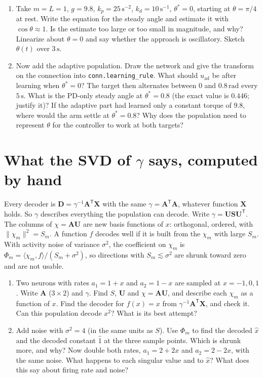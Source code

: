 \documentclass[11pt,letterpaper]{article}
\newcommand{\T}{\mathsf{T}}
\begin{document}
\begin{enumerate}
\item Take $m = L = 1$, $g = 9.8$, $k_p = 25\,\mathrm{s^{-2}}$, $k_d = 10\,\mathrm{s^{-1}}$, $\theta^* = 0$, starting at $\theta = \pi/4$ at rest. Write the equation for the steady angle and estimate it with $\cos\theta \approx 1$. Is the estimate too large or too small in magnitude, and why? Linearize about $\theta = 0$ and say whether the approach is oscillatory. Sketch $\theta(t)$ over $3\,\mathrm{s}$.
\item Now add the adaptive population. Draw the network and give the transform on the connection into \texttt{conn.learning\_rule}. What should $u_{\mathrm{ad}}$ be after learning when $\theta^* = 0$? The target then alternates between $0$ and $0.8\,\mathrm{rad}$ every $5\,\mathrm{s}$. What is the PD-only steady angle at $\theta^* = 0.8$ (the exact value is $0.446$; justify it)? If the adaptive part had learned only a constant torque of $9.8$, where would the arm settle at $\theta^* = 0.8$? Why does the population need to represent $\theta$ for the controller to work at both targets?
\end{enumerate}

\section{What the SVD of $\gamma$ says, computed by hand}

\begin{idea}
Every decoder is $\mathbf D = \gamma^{-1}\mathbf A^\T\mathbf X$ with the same $\gamma = \mathbf A^\T\mathbf A$, whatever function $\mathbf X$ holds. So $\gamma$ describes everything the population can decode. Write $\gamma = \mathbf U\mathbf S\mathbf U^\T$. The columns of $\chi = \mathbf A\mathbf U$ are new basis functions of $x$: orthogonal, ordered, with $\|\chi_m\|^2 = S_m$. A function $f$ decodes well if it is built from the $\chi_m$ with large $S_m$. With activity noise of variance $\sigma^2$, the coefficient on $\chi_m$ is $\Phi_m = \langle\chi_m, f\rangle/(S_m + \sigma^2)$, so directions with $S_m \lesssim \sigma^2$ are shrunk toward zero and are not usable.
\end{idea}

\begin{enumerate}
\item Two neurons with rates $a_1 = 1 + x$ and $a_2 = 1 - x$ are sampled at $x = -1, 0, 1$. Write $\mathbf A$ ($3 \times 2$) and $\gamma$. Find $S$, $\mathbf U$ and $\chi = \mathbf A\mathbf U$, and describe each $\chi_m$ as a function of $x$. Find the decoder for $f(x) = x$ from $\gamma^{-1}\mathbf A^\T\mathbf X$, and check it. Can this population decode $x^2$? What is its best attempt?
\item Add noise with $\sigma^2 = 4$ (in the same units as $S$). Use $\Phi_m$ to find the decoded $\hat x$ and the decoded constant $\hat 1$ at the three sample points. Which is shrunk more, and why? Now double both rates, $a_1 = 2 + 2x$ and $a_2 = 2 - 2x$, with the same noise. What happens to each singular value and to $\hat x$? What does this say about firing rate and noise?
\end{enumerate}
\end{document}
